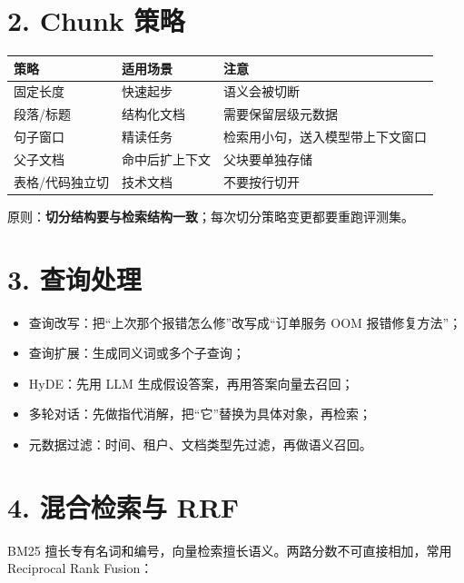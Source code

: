 \documentclass[9pt,a4paper,twocolumn]{ctexart}
\begin{document}
\section*{2. Chunk 策略}

{\footnotesize
\begin{tabular}{|p{}|p{}|p{}|}
\hline
\textbf{策略} & \textbf{适用场景} & \textbf{注意} \\
\hline
固定长度 & 快速起步 & 语义会被切断 \\
\hline
段落/标题 & 结构化文档 & 需要保留层级元数据 \\
\hline
句子窗口 & 精读任务 & 检索用小句，送入模型带上下文窗口 \\
\hline
父子文档 & 命中后扩上下文 & 父块要单独存储 \\
\hline
表格/代码独立切 & 技术文档 & 不要按行切开 \\
\hline
\end{tabular}
}



原则：\textbf{切分结构要与检索结构一致}；每次切分策略变更都要重跑评测集。



\section*{3. 查询处理}

\begin{itemize}[itemsep=1pt, topsep=2pt]
  \item 查询改写：把“上次那个报错怎么修”改写成“订单服务 OOM 报错修复方法”；
  \item 查询扩展：生成同义词或多个子查询；
  \item HyDE：先用 LLM 生成假设答案，再用答案向量去召回；
  \item 多轮对话：先做指代消解，把“它”替换为具体对象，再检索；
  \item 元数据过滤：时间、租户、文档类型先过滤，再做语义召回。
\end{itemize}


\section*{4. 混合检索与 RRF}


BM25 擅长专有名词和编号，向量检索擅长语义。两路分数不可直接相加，常用 Reciprocal Rank Fusion：
\end{document}
